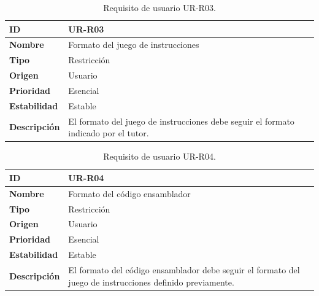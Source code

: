 \begin{center}
\begin{table}[htbp]
\centering
\begin{tabular}{@{}p{2.5cm} p{9cm}@{}} 
\toprule
\textbf{ID} 				& UR-R03 \\
\midrule
\textbf{Nombre} 			& Formato del juego de instrucciones \\
\midrule
\textbf{Tipo} 			& Restricción \\
\midrule
\textbf{Origen} 			& Usuario \\
\midrule
\textbf{Prioridad}		& Esencial \\
\midrule
\textbf{Estabilidad} 		& Estable \\
\midrule
\textbf{Descripción} 	& El formato del juego de instrucciones debe seguir el formato indicado por el tutor. \\
\bottomrule
\end{tabular}
\caption{Requisito de usuario UR-R03.}
\label{tab:urr03}
\end{table}
\end{center}

\begin{center}
\begin{table}[htbp]
\centering
\begin{tabular}{@{}p{2.5cm} p{9cm}@{}} 
\toprule
\textbf{ID} 				& UR-R04 \\
\midrule
\textbf{Nombre} 			& Formato del código ensamblador \\
\midrule
\textbf{Tipo} 			& Restricción \\
\midrule
\textbf{Origen} 			& Usuario \\
\midrule
\textbf{Prioridad}		& Esencial \\
\midrule
\textbf{Estabilidad} 		& Estable \\
\midrule
\textbf{Descripción} 	& El formato del código ensamblador debe seguir el formato del juego de instrucciones definido previamente. \\
\bottomrule
\end{tabular}
\caption{Requisito de usuario UR-R04.}
\label{tab:urr04}
\end{table}
\end{center}

